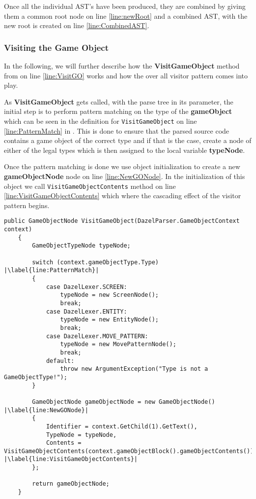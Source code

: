 Once all the individual AST's have been produced, they are combined by giving them a common root node on line \ref{line:newRoot} and a combined AST, with the new root is created on line \ref{line:CombinedAST}.
 
\subsubsection*{Visiting the Game Object}
In the following, we will further describe how the \textbf{VisitGameObject} method from  on line \ref{line:VisitGO} works and how the over all visitor pattern comes into play.

As \textbf{VisitGameObject} gets called, with the parse tree in its parameter, the initial step is to perform pattern matching on the type of the \textbf{gameObject} which can be seen in the definition for \texttt{VisitGameObject} on line \ref{line:PatternMatch} in . This is done to ensure that the parsed source code contains a game object of the correct type and if that is the case, create a node of either of the legal types which is then assigned to the local variable \textbf{typeNode}.

Once the pattern matching is done we use object initialization to create a new \textbf{gameObjectNode} node on line \ref{line:NewGONode}. In the initialization of this object we call \texttt{VisitGameObjectContents} method on line \ref{line:VisitGameObjectContents} which where the cascading effect of the visitor pattern begins.

\begin{lstlisting}[caption={The initial stage of visiting}, label={lst:VisitParseTree},escapechar=|]
    public GameObjectNode VisitGameObject(DazelParser.GameObjectContext context)
    {
        GameObjectTypeNode typeNode;
        
        switch (context.gameObjectType.Type) |\label{line:PatternMatch}|
        {
            case DazelLexer.SCREEN:
                typeNode = new ScreenNode();
                break;
            case DazelLexer.ENTITY:
                typeNode = new EntityNode();
                break;
            case DazelLexer.MOVE_PATTERN:
                typeNode = new MovePatternNode();
                break;
            default:
                throw new ArgumentException("Type is not a GameObjectType!");
        }

        GameObjectNode gameObjectNode = new GameObjectNode() |\label{line:NewGONode}|
        {
            Identifier = context.GetChild(1).GetText(),
            TypeNode = typeNode,
            Contents = VisitGameObjectContents(context.gameObjectBlock().gameObjectContents()) |\label{line:VisitGameObjectContents}|
        };
        
        return gameObjectNode;
    }
\end{lstlisting}







